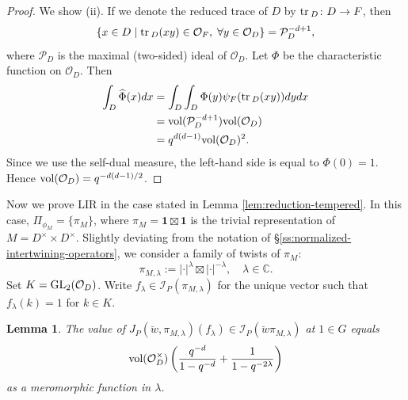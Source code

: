 \documentclass[11pt,reqno]{amsart}
\theoremstyle{plain}
\newtheorem{lem}[thm]{Lemma}
\theoremstyle{definition}
\newcommand{\C}{\mathbb{C}}
\newcommand{\cO}{\mathcal{O}}
\newcommand{\cP}{\mathcal{P}}
\newcommand{\cI}{\mathcal{I}}
\newcommand{\tr}{\tu{tr}\,}
\newcommand{\GL}{\tu{GL}}
\newcommand{\triv}{{\mathbf{1}}}
\newcommand{\vol}{\tu{vol}}
\newcommand{\tu}{\textup}
\renewcommand{\hat}{\widehat}
\numberwithin{equation}{subsection}
\begin{document}
\begin{proof}
We show (ii).
If we denote the reduced trace of $D$ by $\tr_D \colon D \rightarrow F$, 
then 
\[
\{
x \in D \;|\; \tr_D(xy) \in \cO_F,\; \forall y \in \cO_D
\} 
= \cP_D^{-d+1}, 
\]
where $\cP_D$ is the maximal (two-sided) ideal of $\cO_D$.
Let $\Phi$ be the characteristic function on $\cO_D$. 
Then 
\begin{align*}
    \int_D \hat\Phi(x) dx 
    &= \int_D \int_D \Phi(y) \psi_F(\tr_D(xy)) dydx \\
    &= \vol(\cP_D^{-d+1})\vol(\cO_D) \\
    &= q^{d(d-1)}\vol(\cO_D)^2.
\end{align*}
Since we use the self-dual measure, 
the left-hand side is equal to $\Phi(0) = 1$. 
Hence $\vol(\cO_D) = q^{-d(d-1)/2}$.
\end{proof}

Now we prove LIR in the case stated in Lemma \ref{lem:reduction-tempered}. In this case, $\Pi_{\phi_M}=\{\pi_M\}$, where $\pi_M=\triv\boxtimes \triv$ is the trivial representation of $M =D^\times \times D^\times$. 
Slightly deviating from the notation of \S\ref{ss:normalized-intertwining-operators}, we consider a family of twists of $\pi_M$:
\[
\pi_{M,\lambda}:=|\cdot|^{\lambda}\boxtimes |\cdot|^{-\lambda},\quad \lambda\in \C.
\]
Set $K = \GL_2(\cO_D)$.
Write $f_\lambda\in \cI_P(\pi_{M,\lambda})$ for the unique vector such that $f_\lambda(k) = 1$ for $k \in K$.
\par






\begin{lem}\label{lem:unnormalized-intertwining}
The value of $J_{P}(\breve{w},\pi_{M,\lambda})(f_\lambda)\in \cI_{P}(\breve{w}\pi_{M,\lambda})$ at $1\in G$ equals 
\[
\vol(\cO_D^\times)\left(
\frac{q^{-d}}{1-q^{-d}} + \frac{1}{1-q^{-2\lambda}}
\right)
\]
as a meromorphic function in $\lambda$.
\end{lem}
\end{document}
